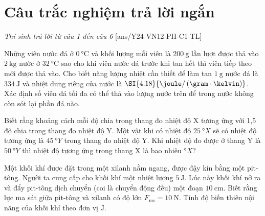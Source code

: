 \section{Câu trắc nghiệm trả lời ngắn} \textit{Thí sinh trả lời từ câu 1 đến câu 6}
\setcounter{ex}{0}
[ans/Y24-VN12-PH-C1-TL]
\begin{ex}
Những viên nước đá ở $\SI{0}{\celsius}$ và khối lượng mỗi viên là $\SI{200}{\gram}$ lần lượt được thả vào $\SI{2}{\kilogram}$ nước ở $\SI{32}{\celsius}$ sao cho khi viên nước đá trước khi tan hết thì viên tiếp theo mới được thả vào. Cho biết năng lượng nhiệt cần thiết để làm tan $\SI{1}{\gram}$ nước đá  là $\SI{334}{\joule}$ và nhiệt dung riêng của nước là $\SI{4.18}{\joule/\left(\gram\cdot\kelvin\right)}$. Xác định số viên đá tối đa có thể thả vào lượng nước trên để trong nước không còn sót lại phần đá nào.	
\end{ex}
\begin{ex}
Biết rằng khoảng cách mỗi độ chia trong thang đo nhiệt độ X tương ứng với 1,5 độ chia trong thang đo nhiệt độ Y. Một vật khi có nhiệt độ $\SI{25}{\degree X}$ sẽ có nhiệt độ tương ứng là $\SI{45}{\degree Y}$ trong thang đo nhiệt độ Y. Khi nhiệt độ đo được ở thang Y là $\SI{50}{\degree Y}$ thì nhiệt độ tương ứng trong thang X là bao nhiêu $\si{\degree X}$?	
\end{ex}
\begin{ex}
Một khối khí được đặt trong một xilanh nằm ngang, được đậy kín bằng một pit-tông. Người ta cung cấp cho khối khí một nhiệt lượng $\SI{5}{\joule}$. Lúc này khối khí nở ra và đẩy pit-tông dịch chuyển (coi là chuyển động đều) một đoạn $\SI{10}{\centi\meter}$. Biết rằng lực ma sát giữa pit-tông và xilanh có độ lớn $F_{\text{ms}} =\SI{10}{\newton}$. Tính độ biến thiên nội năng của khối khí theo đơn vị $\si{\joule}$.	
\end{ex}

